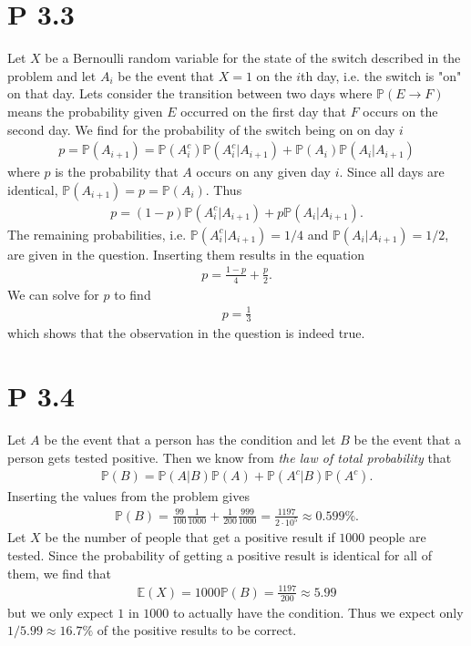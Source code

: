 \documentclass{article}
\renewcommand{\P}{\mathbb{P}}
\newcommand{\E}{\mathbb{E}}
\begin{document}
\section*{P 3.3}
Let $X$ be a Bernoulli random variable for the state of the switch described in the
problem and let $A_i$ be the event that $X=1$ on the $i$th day, i.e. the switch is 
"on" on that day. Lets consider the transition between two days where $\P(E\to F)$ 
means the probability given $E$ occurred on the first day that $F$ occurs on the
second day. We find for the probability of the switch being on on day $i$
\begin{align*}
  p=\P(A_{i+1}) = \P(A^c_i)\P(A^c_i | A_{i+1}) + \P(A_i)\P(A_i|A_{i+1})
\end{align*}
where $p$ is the probability that $A$ occurs on any given day $i$. Since all days are
identical, $\P(A_{i+1})=p=\P(A_i)$. Thus
\begin{align*}
  p = (1-p)\P(A^c_i|A_{i+1}) + p\P(A_i|A_{i+1}).
\end{align*}
The remaining probabilities, i.e. $\P(A^c_i|A_{i+1})=1/4$ and $\P(A_i|A_{i+1})=1/2$, 
are given in the question. Inserting them results in the equation
\begin{align*}
  p=\frac{1-p}{4} + \frac{p}{2}.
\end{align*}
We can solve for $p$ to find 
\begin{align*}
  p=\frac{1}{3}
\end{align*}
which shows that the observation in the question is indeed true.
\section*{P 3.4}
Let $A$ be the event that a person has the condition and let $B$ be the event that
a person gets tested positive. Then we know from \emph{the law of total probability}
that
\begin{align*}
  \P(B) = \P(A|B)\P(A) + \P(A^c|B)\P(A^c).
\end{align*}
Inserting the values from the problem gives
\begin{align*}
  \P(B) = \frac{99}{100}\frac{1}{1000}+\frac{1}{200}\frac{999}{1000}=\frac{1197}{2\cdot 10^5}\approx 0.599\%.
\end{align*}
Let $X$ be the number of people that get a positive result if $1000$ people are tested.
Since the probability of getting a positive result is identical for all of them, we
find that
\begin{align*}
  \E(X) = 1000 \P(B)=\frac{1197}{200}\approx 5.99
\end{align*}
but we only expect $1$ in $1000$ to actually have the condition. Thus
we expect only $1/5.99\approx 16.7\%$ of the positive results to be correct.
\end{document}
